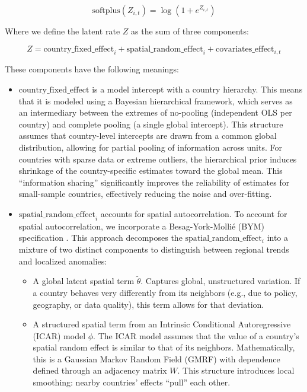 \begin{equation}
\text{softplus}(Z_{i,t}) = \log(1 + e^{Z_{i,t}})
\end{equation}

Where we define the latent rate $Z$ as the sum of three components:

\begin{equation}
Z = \text{country\_fixed\_effect}_{i} + \text{spatial\_random\_effect}_{i} + \text{covariates\_effect}_{i,t}
\end{equation}

These components have the following meanings:

\begin{itemize}
    \item $\text{country\_fixed\_effect}$ is a model intercept with a country hierarchy. This means that it is modeled using a Bayesian hierarchical framework, which serves as an intermediary between the extremes of no-pooling (independent OLS per country) and complete pooling (a single global intercept). This structure assumes that country-level intercepts are drawn from a common global distribution, allowing for partial pooling of information across units. For countries with sparse data or extreme outliers, the hierarchical prior induces shrinkage of the country-specific estimates toward the global mean. This ``information sharing'' significantly improves the reliability of estimates for small-sample countries, effectively reducing the noise and over-fitting.

\item $\text{spatial\_random\_effect}_{i}$ accounts for spatial autocorrelation. To account for spatial autocorrelation, we incorporate a Besag-York-Molli\'{e} (BYM) specification \citep{besag1991bayesian}. This approach decomposes the $\text{spatial\_}\allowbreak\text{random\_}\allowbreak\text{effect}_{i}$ into a mixture of two distinct components to distinguish between regional trends and localized anomalies:
    \begin{itemize}
        \item A global latent spatial term $\tilde{\theta}$. Captures global, unstructured variation. If a country behaves very differently from its neighbors (e.g., due to policy, geography, or data quality), this term allows for that deviation.
        \item A structured spatial term from an Intrinsic Conditional Autoregressive (ICAR) model $\phi$. The ICAR model assumes that the value of a country's spatial random effect is similar to that of its neighbors. Mathematically, this is a Gaussian Markov Random Field (GMRF) with dependence defined through an adjacency matrix $W$. This structure introduces local smoothing: nearby countries' effects ``pull'' each other.
    \end{itemize}
\end{itemize}

